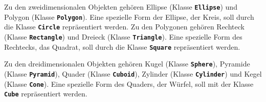 Zu den zweidimensionalen Objekten gehören Ellipse (Klasse \texttt{\textbf{Ellipse}}) und Polygon (Klasse \texttt{\textbf{Polygon}}). Eine spezielle Form der Ellipse, der Kreis, soll durch die Klasse \texttt{\textbf{Circle}} repräsentiert werden. Zu den Polygonen gehören Rechteck (Klasse \texttt{\textbf{Rectangle}}) und Dreieck (Klasse \texttt{\textbf{Triangle}}). Eine spezielle Form des Rechtecks, das Quadrat, soll durch die Klasse \texttt{\textbf{Square}} repräsentiert werden.

Zu den dreidimensionalen Objekten gehören Kugel (Klasse \texttt{\textbf{Sphere}}), Pyramide (Klasse \texttt{\textbf{Pyramid}}), Quader (Klasse \texttt{\textbf{Cuboid}}), Zylinder (Klasse \texttt{\textbf{Cylinder}}) und Kegel (Klasse \texttt{\textbf{Cone}}). Eine spezielle Form des Quaders, der Würfel, soll mit der Klasse \texttt{\textbf{Cube}} repräsentiert werden.
